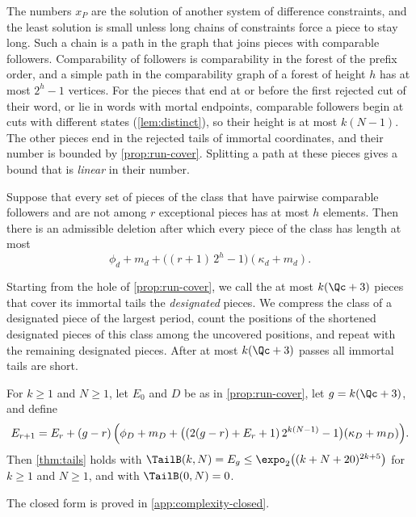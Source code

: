 The numbers $x_P$ are the solution of another system of difference
constraints, and the least solution is small unless long chains of
constraints force a piece to stay long. Such a chain is a path in the graph
that joins pieces with comparable followers. Comparability of followers is
comparability in the forest of the prefix order, and a simple path in the
comparability graph of a forest of height $h$ has at most $2^h-1$ vertices.
For the pieces that end at or before the first rejected cut of their word,
or lie in words with mortal endpoints, comparable followers begin at cuts
with different states (\cref{lem:distinct}), so their height is at most
$k(N-1)$. The other pieces end in the rejected tails of immortal
coordinates, and their number is bounded by \cref{prop:run-cover}.
Splitting a path at these pieces gives a bound that is \emph{linear} in
their number.

\begin{lemma}\label{lem:cap}
Suppose that every set of pieces of the class that have pairwise comparable
followers and are not among $r$ exceptional pieces has at most $h$ elements.
Then there is an admissible deletion after which every piece of the class
has length at most
\[
  \phi_d+m_d+\bigl((r+1)\,2^{h}-1\bigr)(\kappa_d+m_d).
\]
\end{lemma}

Starting from the hole of \cref{prop:run-cover}, we call the at most
$k(\Qc+3)$ pieces that cover its immortal tails the \emph{designated}
pieces. We compress the class of a designated piece of the largest period,
count the positions of the shortened designated pieces of this class among
the uncovered positions, and repeat with the remaining designated pieces.
After at most $k(\Qc+3)$ passes all immortal tails are short.

\begin{theorem}\label{thm:tails-bound}
For $k\ge1$ and $N\ge1$, let $E_0$ and $D$ be as in \cref{prop:run-cover},
let $g=k(\Qc+3)$, and define
\[
  E_{r+1}=E_r+(g-r)\,\Bigl(\phi_D+m_D+\bigl((2(g-r)+E_r+1)\,2^{k(N-1)}-1\bigr)
  (\kappa_D+m_D)\Bigr).
\]
Then \cref{thm:tails} holds with
$\TailB(k,N)=E_g\le\expo_2\bigl((k+N+20)^{2k+5}\bigr)$ for $k\ge1$ and
$N\ge1$, and with $\TailB(0,N)=0$.
\end{theorem}

The closed form is proved in \cref{app:complexity-closed}.
